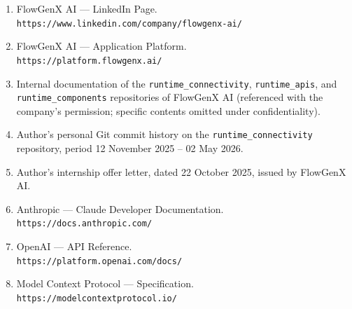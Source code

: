 \begin{enumerate}[leftmargin=*]
    \item FlowGenX AI --- LinkedIn Page. \\
    \texttt{https://www.linkedin.com/company/flowgenx-ai/}

    \item FlowGenX AI --- Application Platform. \\
    \texttt{https://platform.flowgenx.ai/}

    \item Internal documentation of the
    \texttt{runtime\_connectivity}, \texttt{runtime\_apis}, and
    \texttt{runtime\_components} repositories of FlowGenX AI
    (referenced with the company's permission; specific contents
    omitted under confidentiality).

    \item Author's personal Git commit history on the
    \texttt{runtime\_connectivity} repository, period 12 November 2025
    -- 02 May 2026.

    \item Author's internship offer letter, dated 22 October 2025,
    issued by FlowGenX AI.

    \item Anthropic --- Claude Developer Documentation. \\
    \texttt{https://docs.anthropic.com/}

    \item OpenAI --- API Reference. \\
    \texttt{https://platform.openai.com/docs/}


    \item Model Context Protocol --- Specification. \\
    \texttt{https://modelcontextprotocol.io/}
\end{enumerate}
